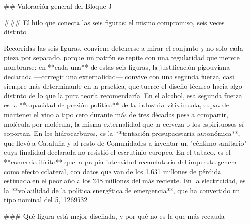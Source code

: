 \documentclass[10pt,a4paper]{article}
\begin{document}
## Valoración general del Bloque 3

### El hilo que conecta las seis figuras: el mismo compromiso, seis veces distinto

Recorridas las seis figuras, conviene detenerse a mirar el conjunto y no solo cada pieza por separado, porque un patrón se repite con una regularidad que merece nombrarse: en **cada una** de estas seis figuras, la justificación pigouviana declarada —corregir una externalidad— convive con una segunda fuerza, casi siempre más determinante en la práctica, que tuerce el diseño técnico hacia algo distinto de lo que la pura teoría recomendaría. En el alcohol, esa segunda fuerza es la **capacidad de presión política** de la industria vitivinícola, capaz de mantener el vino a tipo cero durante más de tres décadas pese a compartir, molécula por molécula, la misma externalidad que la cerveza o los espirituosos sí soportan. En los hidrocarburos, es la **tentación presupuestaria autonómica**, que llevó a Cataluña y al resto de Comunidades a inventar un "céntimo sanitario" cuya finalidad declarada no resistió el escrutinio europeo. En el tabaco, es el **comercio ilícito** que la propia intensidad recaudatoria del impuesto genera como efecto colateral, con datos que van de los 1.631 millones de pérdida estimada en el peor año a los 248 millones del más reciente. En la electricidad, es la **volatilidad de la política energética de emergencia**, que ha convertido un tipo nominal del 5,11269632%

### Qué figura está mejor diseñada, y por qué no es la que más recauda
\end{document}
